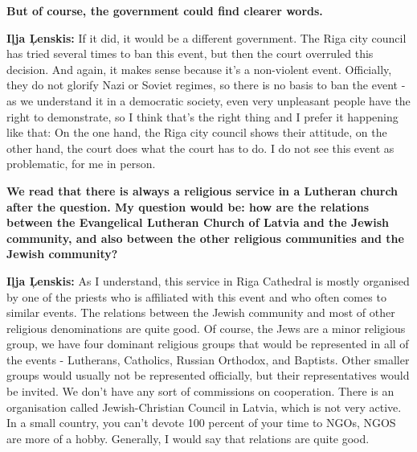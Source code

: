 \textbf{But of course, the government could find clearer words.} 

\textbf{Iļja Ļenskis:} If it did, it would be a different government. The Riga city council  has tried several times to ban this event, but then the court overruled this decision. And again, it makes sense because it’s a non-violent event. Officially, they do not glorify Nazi or Soviet regimes, so there is no basis to ban the event - as we understand it in a democratic society, even very unpleasant people have the right to demonstrate, so I think that’s the right thing and I prefer it happening like that: On the one hand, the Riga city council shows their attitude, on the other hand, the court does what the court has to do. I do not see this event as problematic, for me in person.

\textbf{We read that there is always a religious service in a Lutheran church after the question. My question would be: how are the relations between the Evangelical Lutheran Church of Latvia and the Jewish community, and also between the other religious communities and the Jewish community?}

\textbf{Iļja Ļenskis:} As I understand, this service in Riga Cathedral is mostly organised by one of the priests who is affiliated with this event and who often comes to similar events. The relations between the Jewish community and most of other religious denominations are quite good. Of course, the Jews are a minor religious group, we have four dominant religious groups that would be represented in all of the events - Lutherans, Catholics, Russian Orthodox, and Baptists. Other smaller groups would usually not be represented officially, but their representatives would be invited. We don’t have any sort of commissions on cooperation. There is an organisation called Jewish-Christian Council in Latvia, which is not very active. In a small country, you can’t devote 100 percent of your time to NGOs, NGOS are more of a hobby. Generally, I would say that relations are quite good. 

%

